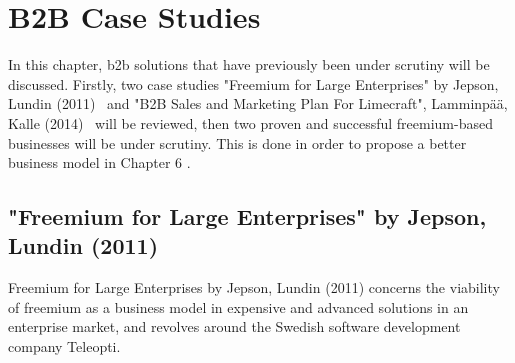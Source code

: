 \chapter{B2B Case Studies}
In this chapter, \gls{b2b} solutions that have previously been under scrutiny will be discussed. Firstly, two case studies "Freemium for Large Enterprises" by Jepson, Lundin (2011)~\cite{jepson2009freemium} and "B2B Sales and Marketing Plan For Limecraft", Lamminpää, Kalle (2014)~\cite{lamminpaa2014b2b} will be reviewed, then two proven and successful freemium-based businesses will be under scrutiny. This is done in order to propose a better business model in Chapter 6
.
\section{"Freemium for Large Enterprises" by Jepson, Lundin (2011)}
Freemium for Large Enterprises by Jepson, Lundin (2011) concerns the viability of freemium as a business model in expensive and advanced solutions in an enterprise market, and revolves around the Swedish software development company Teleopti.

